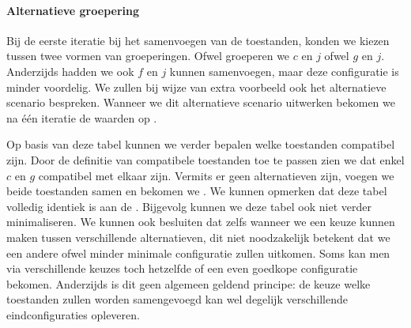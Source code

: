 \paragraph{Alternatieve groepering}Bij de eerste iteratie bij het samenvoegen van de toestanden, konden we kiezen tussen twee vormen van groeperingen. Ofwel groeperen we $c$ en $j$ ofwel $g$ en $j$. Anderzijds hadden we ook $f$ en $j$ kunnen samenvoegen, maar deze configuratie is minder voordelig. We zullen bij wijze van extra voorbeeld ook het alternatieve scenario bespreken. Wanneer we dit alternatieve scenario uitwerken bekomen we na \'e\'en iteratie de waarden op .
\begin{table}[hbt]
\centering
{}
\caption{Evolutie van de toestandstabel bij een alternatieve minimalisering voor en na twee iteraties.}
\end{table}
Op basis van deze tabel kunnen we verder bepalen welke toestanden compatibel zijn. Door de definitie van compatibele toestanden toe te passen zien we dat enkel $c$ en $g$ compatibel met elkaar zijn. Vermits er geen alternatieven zijn, voegen we beide toestanden samen en bekomen we . We kunnen opmerken dat deze tabel volledig identiek is aan de . Bijgevolg kunnen we deze tabel ook niet verder minimaliseren. We kunnen ook besluiten dat zelfs wanneer we een keuze kunnen maken tussen verschillende alternatieven, dit niet noodzakelijk betekent dat we een andere ofwel minder minimale configuratie zullen uitkomen. Soms kan men via verschillende keuzes toch hetzelfde of een even goedkope configuratie bekomen. Anderzijds is dit geen algemeen geldend principe: de keuze welke toestanden zullen worden samengevoegd kan wel degelijk verschillende eindconfiguraties opleveren.
